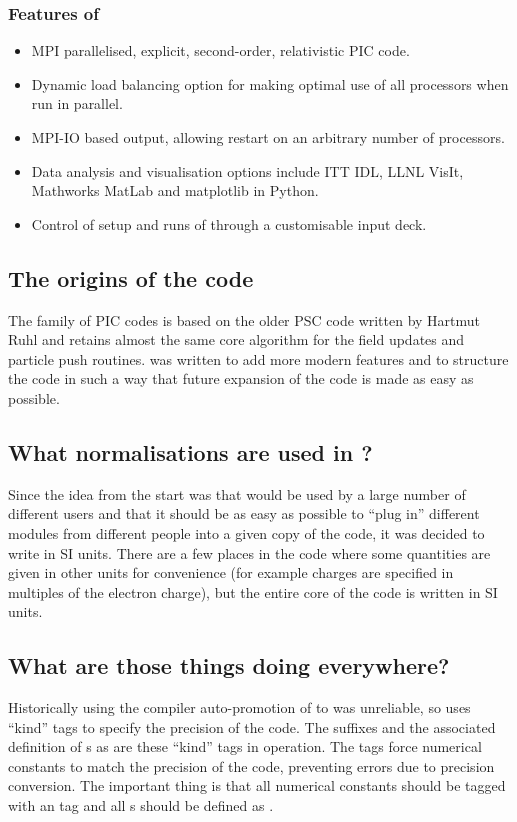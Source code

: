 \subsubsection{\texorpdfstring
  {Features of {\EPOCH}}
  {Features of {EPOCH}}}
\begin{itemize}
  \item MPI parallelised, explicit, second-order, relativistic PIC code.
  \item Dynamic load balancing option for making optimal use of all processors
    when run in parallel.
  \item MPI-IO based output, allowing restart on an arbitrary number of
    processors.
  \item Data analysis and visualisation options include ITT IDL, LLNL VisIt,
    Mathworks MatLab and matplotlib in Python.
  \item Control of setup and runs of {\EPOCH} through a customisable input deck.
\end{itemize}

\subsection{The origins of the code}
The {\EPOCH} family of PIC codes is based on the older PSC code written by
Hartmut Ruhl and retains almost the same core algorithm for the field updates
and particle push routines. {\EPOCH} was written to add more modern features
and to structure the code in such a way that future expansion of the code is
made as easy as possible.

\subsection{\texorpdfstring
  {What normalisations are used in {\EPOCH}?}
  {What normalisations are used in {EPOCH}?}}
Since the idea from the start was that {\EPOCH} would be used by a large number
of different users and that it should be as easy as possible to ``plug in''
different modules from different people into a given copy of the code, it was
decided to write {\EPOCH} in SI units. There are a few places in the code where
some quantities are given in other units for convenience (for example charges
are specified in multiples of the electron charge), but the entire core of the
code is written in SI units.

\subsection{What are those  things doing everywhere?}
Historically using the compiler auto-promotion of  to
 was unreliable, so {\EPOCH} uses ``kind'' tags to
specify the precision of the code. The  suffixes and the associated
definition of s as  are these ``kind'' tags in
operation. The  tags force numerical constants to match the
precision of the code, preventing errors due to precision conversion. The
important thing is that all numerical constants should be tagged with an
 tag and all s should be defined as .

